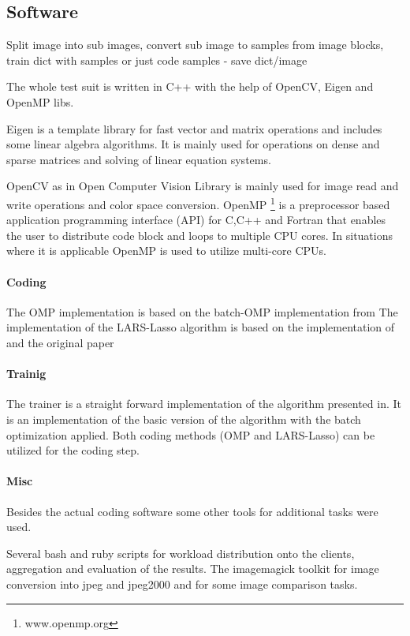 \subsection*{Software}

Split image into sub images, convert sub image to samples from image blocks, 
train dict with samples or just code samples - save dict/image

The whole test suit is written in C++ with the help  of OpenCV, Eigen and OpenMP libs.

Eigen\cite{Eigen} is a template library for fast vector and matrix operations 
and includes some linear algebra algorithms. It is mainly used for operations on
dense and sparse matrices and solving of linear equation systems.

OpenCV\cite{OpenCV} as in Open Computer Vision Library is mainly used for
image read and write operations and color space conversion. OpenMP
\footnote{www.openmp.org\cite{OpenMP}} is a preprocessor based application
programming interface (API) for C,C++ and Fortran that enables the user to
distribute code block and loops to multiple CPU cores. In situations where it is
applicable OpenMP is used to utilize multi-core CPUs. 

\paragraph{Coding}
The OMP implementation is based on the batch-OMP implementation
from\cite{Rubinstein} The implementation of the LARS-Lasso algorithm is based on
the implementation of\cite{Strand2005} and the original paper\cite{Efron2004}

\paragraph{Trainig}
The \trainDL trainer is a straight forward implementation of the
algorithm presented in\cite{Mairal2010}. It is an implementation of the basic
version of the algorithm with the batch optimization applied. Both coding
methods (OMP and LARS-Lasso) can be utilized for the coding step.

\paragraph{Misc}
 Besides the actual coding software some other tools for
additional tasks were used.

Several bash and ruby scripts for workload distribution onto the
clients, aggregation and evaluation of the results. The imagemagick toolkit for
image conversion into jpeg and jpeg2000 and for some image comparison tasks.








